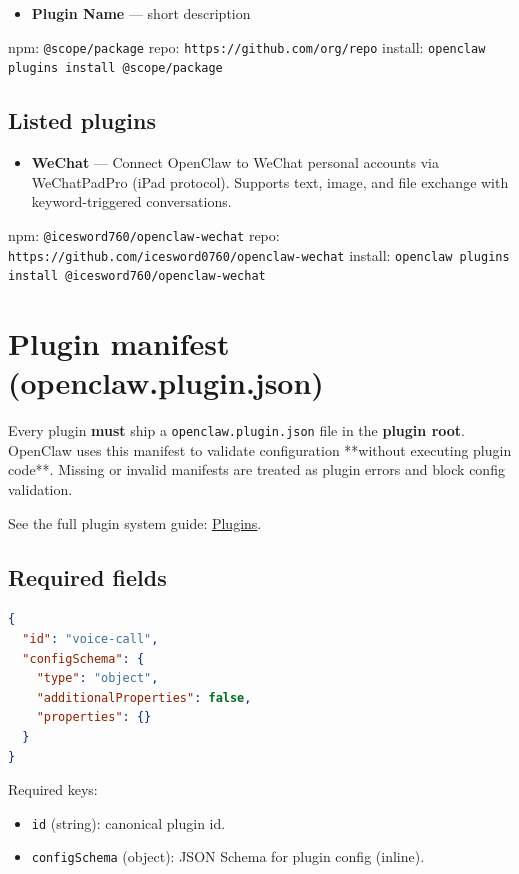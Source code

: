 \begin{itemize}
  \item \textbf{Plugin Name} — short description
\end{itemize}

npm: \texttt{@scope/package}
repo: \texttt{https://github.com/org/repo}
install: \texttt{openclaw plugins install @scope/package}

\subsection{Listed plugins}


\begin{itemize}
  \item \textbf{WeChat} — Connect OpenClaw to WeChat personal accounts via WeChatPadPro (iPad protocol). Supports text, image, and file exchange with keyword-triggered conversations.
\end{itemize}

npm: \texttt{@icesword760/openclaw-wechat}
repo: \texttt{https://github.com/icesword0760/openclaw-wechat}
install: \texttt{openclaw plugins install @icesword760/openclaw-wechat}


\clearpage

\section{Plugin manifest (openclaw.plugin.json)}


Every plugin \textbf{must} ship a \texttt{openclaw.plugin.json} file in the \textbf{plugin root}.
OpenClaw uses this manifest to validate configuration **without executing plugin
code**. Missing or invalid manifests are treated as plugin errors and block
config validation.

See the full plugin system guide: \href{/tools/plugin}{Plugins}.

\subsection{Required fields}


\begin{lstlisting}[language=json]
{
  "id": "voice-call",
  "configSchema": {
    "type": "object",
    "additionalProperties": false,
    "properties": {}
  }
}
\end{lstlisting}


Required keys:

\begin{itemize}
  \item \texttt{id} (string): canonical plugin id.
  \item \texttt{configSchema} (object): JSON Schema for plugin config (inline).
\end{itemize}



